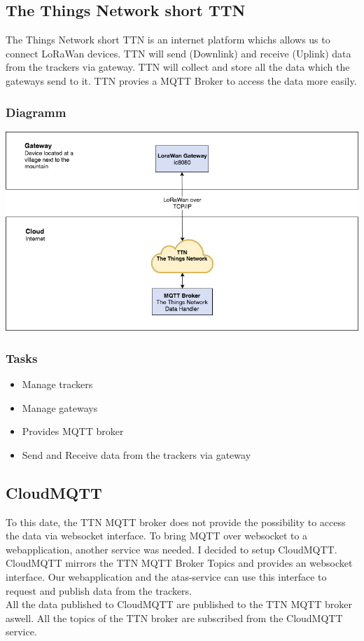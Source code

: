 \documentclass[a4paper,11pt, oneside]{report}
\theoremstyle{definition}
\begin{document}
\subsection{The Things Network short TTN}
The Things Network short TTN is an internet platform whichs allows us to connect LoRaWan devices. TTN will send (Downlink) and receive (Uplink) data from the trackers via gateway. TTN will collect and store all the data which the gateways send to it. TTN provies a MQTT Broker to access the data more easily.

\subsubsection{Diagramm}
\includegraphics[width=\textwidth]{img/ATAS_SystemOverview_Detail_TTN.png}

\subsubsection{Tasks}
\begin{itemize}
\item Manage trackers
\item Manage gateways
\item Provides MQTT broker
\item Send and Receive data from the trackers via gateway
\end{itemize}

\newpage
\subsection{CloudMQTT}
To this date, the TTN MQTT broker does not provide the possibility to access the data via websocket interface. To bring MQTT over websocket to a  webapplication, another service was needed. I decided to setup CloudMQTT. \\[0.3cm]
CloudMQTT mirrors the TTN MQTT Broker Topics and provides an websocket interface. Our webapplication and the atas-service can use this interface to request and publish data from the trackers.\\[0.3cm]
All the data published to CloudMQTT are published to the TTN MQTT broker aswell. All the topics of the TTN broker are subscribed from the CloudMQTT service. 
\end{document}
